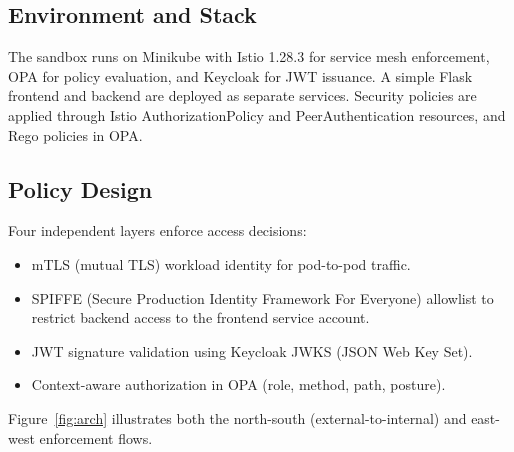 \documentclass[conference]{IEEEtran}
\begin{document}
\subsection{Environment and Stack}
The sandbox runs on Minikube with Istio 1.28.3 for service mesh enforcement, OPA for
policy evaluation, and Keycloak for JWT issuance. A simple Flask frontend and backend
are deployed as separate services. Security policies are applied through Istio
AuthorizationPolicy and PeerAuthentication resources, and Rego policies in OPA.

\subsection{Policy Design}
Four independent layers enforce access decisions:
\begin{itemize}[noitemsep, topsep=3pt, parsep=0pt, partopsep=0pt]
  \item mTLS (mutual TLS) workload identity for pod-to-pod traffic.
  \item SPIFFE (Secure Production Identity Framework For Everyone) allowlist to restrict backend access to the frontend service account.
  \item JWT signature validation using Keycloak JWKS (JSON Web Key Set).
  \item Context-aware authorization in OPA (role, method, path, posture).
\end{itemize}
Figure~\ref{fig:arch} illustrates both the north-south (external-to-internal) and east-west enforcement flows.
\end{document}
